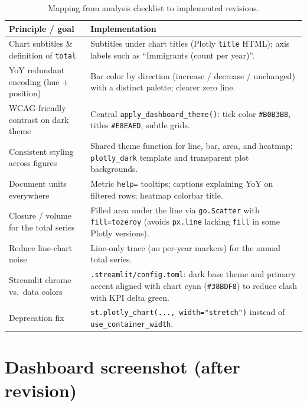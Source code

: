 \documentclass[11pt,a4paper]{article}
\begin{document}
\begin{table}[htbp]
  \centering
  \small
  \begin{tabular}{@{}p{}p{}@{}}
    \toprule
    \textbf{Principle / goal} & \textbf{Implementation} \\
    \midrule
    Chart subtitles \& definition of \texttt{total} &
    Subtitles under chart titles (Plotly \texttt{title} HTML); axis labels such as ``Immigrants (count per year)''. \\
    YoY redundant encoding (hue + position) &
    Bar color by direction (increase / decrease / unchanged) with a distinct palette; clearer zero line. \\
    WCAG-friendly contrast on dark theme &
    Central \texttt{apply\_dashboard\_theme()}: tick color \texttt{\#B0B3B8}, titles \texttt{\#E8EAED}, subtle grids. \\
    Consistent styling across figures &
    Shared theme function for line, bar, area, and heatmap; \texttt{plotly\_dark} template and transparent plot backgrounds. \\
    Document units everywhere &
    Metric \texttt{help=} tooltips; captions explaining YoY on filtered rows; heatmap colorbar title. \\
    Closure / volume for the total series &
    Filled area under the line via \texttt{go.Scatter} with \texttt{fill=tozeroy} (avoids \texttt{px.line} lacking \texttt{fill} in some Plotly versions). \\
    Reduce line-chart noise &
    Line-only trace (no per-year markers) for the annual total series. \\
    Streamlit chrome vs.\ data colors &
    \texttt{.streamlit/config.toml}: dark base theme and primary accent aligned with chart cyan (\texttt{\#38BDF8}) to reduce clash with KPI delta green. \\
    Deprecation fix &
    \texttt{st.plotly\_chart(..., width="stretch")} instead of \texttt{use\_container\_width}. \\
    \bottomrule
  \end{tabular}
  \caption{Mapping from analysis checklist to implemented revisions.}
  \label{tab:checklist}
\end{table}

\section{Dashboard screenshot (after revision)}
\label{sec:after}
\end{document}

